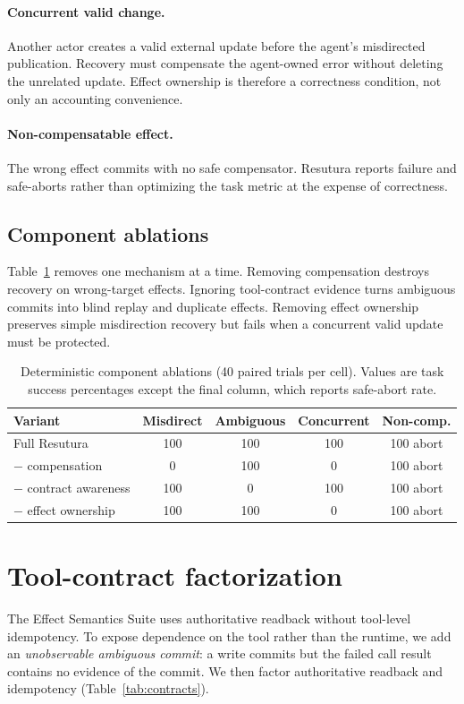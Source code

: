 \documentclass{article}
\begin{document}
\paragraph{Concurrent valid change.} Another actor creates a valid external update before the agent's misdirected publication. Recovery must compensate the agent-owned error without deleting the unrelated update. Effect ownership is therefore a correctness condition, not only an accounting convenience.

\paragraph{Non-compensatable effect.} The wrong effect commits with no safe compensator. Resutura reports failure and safe-aborts rather than optimizing the task metric at the expense of correctness.

\subsection{Component ablations}
Table~\ref{tab:ablations} removes one mechanism at a time. Removing compensation destroys recovery on wrong-target effects. Ignoring tool-contract evidence turns ambiguous commits into blind replay and duplicate effects. Removing effect ownership preserves simple misdirection recovery but fails when a concurrent valid update must be protected.

\begin{table}[t]
\centering
\small
\begin{tabular}{lcccc}
\toprule
Variant & Misdirect & Ambiguous & Concurrent & Non-comp. \\
\midrule
Full Resutura & 100 & 100 & 100 & 100 abort \\
$-$ compensation & 0 & 100 & 0 & 100 abort \\
$-$ contract awareness & 100 & 0 & 100 & 100 abort \\
$-$ effect ownership & 100 & 100 & 0 & 100 abort \\
\bottomrule
\end{tabular}
\caption{Deterministic component ablations (40 paired trials per cell). Values are task success percentages except the final column, which reports safe-abort rate.}
\label{tab:ablations}
\end{table}

\section{Tool-contract factorization}
The Effect Semantics Suite uses authoritative readback without tool-level idempotency. To expose dependence on the tool rather than the runtime, we add an \emph{unobservable ambiguous commit}: a write commits but the failed call result contains no evidence of the commit. We then factor authoritative readback and idempotency (Table~\ref{tab:contracts}).
\end{document}
